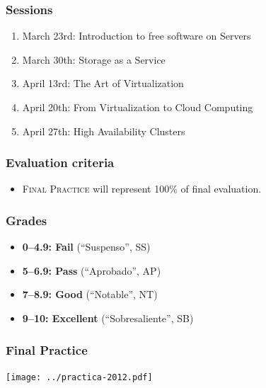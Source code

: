 \documentclass{beamer}
\begin{document}

\begin{frame}
\frametitle{Sessions}

\begin{enumerate}
\item \alert{March 23rd:} Introduction to free software on Servers
\item \alert{March 30th:} Storage as a Service
\item \alert{April 13rd:} The Art of Virtualization
\item \alert{April 20th:} From Virtualization to Cloud Computing
\item \alert{April 27th:} High Availability Clusters
\end{enumerate}

\end{frame}



\begin{frame}
\frametitle{Evaluation criteria}

\begin{itemize}
\item \alert{\textsc{Final Practice}} will represent \alert{100\% of final evaluation}.
\end{itemize}
\end{frame}


\begin{frame}
\frametitle{Grades}

\begin{itemize}
\item \textbf{0--4.9: Fail} (``Suspenso'', SS)
\item \textbf{5--6.9: Pass} (``Aprobado'', AP)
\item \textbf{7--8.9: Good} (``Notable'', NT)
\item \textbf{9--10: Excellent} (``Sobresaliente'', SB)
\end{itemize}

\end{frame}


\begin{frame}
\frametitle{Final Practice}

\vspace{-1cm}

\begin{center}
\texttt{[image: ../practica-2012.pdf]}
\end{center}

\end{frame}
\end{document}
